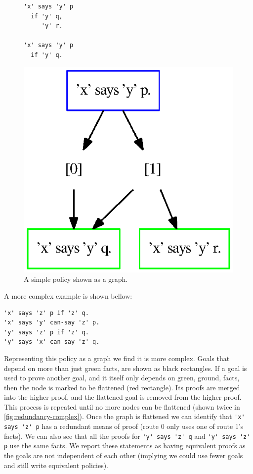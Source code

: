 \documentclass[thesis.tex]{subfiles}
\begin{document}
\begin{figure}
  \centering
  \begin{minipage}{0.4\linewidth}
    \begin{lstlisting}
'x' says 'y' p
  if 'y' q,
     'y' r.

'x' says 'y' p
  if 'y' q.
    \end{lstlisting}
  \end{minipage}
  \begin{minipage}{0.59\linewidth}
    \scriptsize{}\centering
    \def\svgwidth{\columnwidth}
    \includegraphics[width=0.59\linewidth]{figures/redundancy-simple.eps}
  \end{minipage}
  \caption{A simple policy shown as a graph.}
  \label{fig:redundancy-graph-simple}
\end{figure}

A more complex example is shown bellow:

\begin{lstlisting}
'x' says 'z' p if 'z' q.
'x' says 'y' can-say 'z' p.
'y' says 'z' p if 'z' q.
'y' says 'x' can-say 'z' q.
\end{lstlisting}

Representing this policy as a graph we find it is more complex. Goals that
depend on more than just green facts, are shown as black rectangles.  If a goal
is used to prove another goal, and it itself only depends on green, ground,
facts, then the node is marked to be flattened (red rectangle).  Its proofs are
merged into the higher proof, and the flattened goal is removed from the higher
proof.  This process is repeated until no more nodes can be flattened (shown
twice in \autoref{fig:redundancy-complex}).  Once the graph is flattened we can
identify that \lstinline!'x' says 'z' p! has a redundant means of proof (route
0 only uses one of route 1's facts).  We can also see that all the proofs for
\lstinline!'y' says 'z' q! and \lstinline!'y' says 'z' p! use the same facts.
We report these statements as having equivalent proofs as the goals are not
independent of each other (implying we could use fewer goals and still write
equivalent policies).
\end{document}
